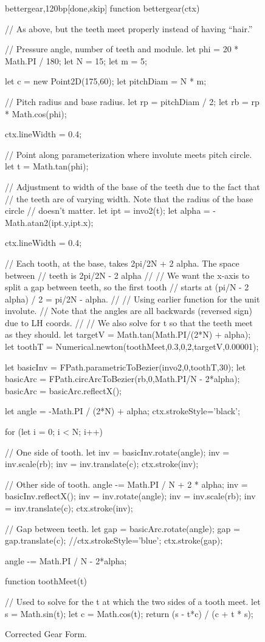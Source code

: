 \documentclass[10pt]{article}
\begin{document}
\begin{figure}
\begin{figput}{bettergear,120bp}[done,skip]
function bettergear(ctx) {

  // As above, but the teeth meet properly instead of having ``hair.''
  
  // Pressure angle, number of teeth and module.
  let phi = 20 * Math.PI / 180;
  let N = 15;
  let m = 5;

  let c = new Point2D(175,60);
  let pitchDiam = N * m;

  // Pitch radius and base radius.
  let rp = pitchDiam / 2;
  let rb = rp * Math.cos(phi);

  ctx.lineWidth = 0.4;
  
  // Point along parameterization where involute meets pitch circle.
  let t = Math.tan(phi);

  // Adjustment to width of the base of the teeth due to the fact that
  // the teeth are of varying width. Note that the radius of the base circle
  // doesn't matter.
  let ipt = invo2(t);
  let alpha = -Math.atan2(ipt.y,ipt.x);

  ctx.lineWidth = 0.4;

  // Each tooth, at the base, takes 2pi/2N + 2 alpha. The space between
  // teeth is 2pi/2N - 2 alpha
  //
  // We want the x-axis to split a gap between teeth, so the first tooth
  // starts at (pi/N - 2 alpha) / 2 = pi/2N - alpha.
  //
  // Using earlier function for the unit involute.
  // Note that the angles are all backwards (reversed sign) due to LH coords.
  //
  // We also solve for t so that the teeth meet as they should.
  let targetV = Math.tan(Math.PI/(2*N) + alpha);
  let toothT = Numerical.newton(toothMeet,0.3,0,2,targetV,0.00001);
  
  let basicInv = FPath.parametricToBezier(invo2,0,toothT,30);
  let basicArc = FPath.circArcToBezier(rb,0,Math.PI/N - 2*alpha);
  basicArc = basicArc.reflectX();

  let angle = -Math.PI / (2*N) + alpha;
  ctx.strokeStyle='black';

  for (let i = 0; i < N; i++)
    {
      // One side of tooth.
      let inv = basicInv.rotate(angle);
      inv = inv.scale(rb);
      inv = inv.translate(c);
      ctx.stroke(inv);

      // Other side of tooth.
      angle -= Math.PI / N + 2 * alpha;
      inv = basicInv.reflectX();
      inv = inv.rotate(angle);
      inv = inv.scale(rb);
      inv = inv.translate(c);
      ctx.stroke(inv);

      // Gap between teeth.
      let gap = basicArc.rotate(angle);
      gap = gap.translate(c);
      //ctx.strokeStyle='blue';
      ctx.stroke(gap);

      angle -= Math.PI / N - 2*alpha;
    }
}

function toothMeet(t) {

  // Used to solve for the t at which the two sides of a tooth meet.
  let s = Math.sin(t);
  let c = Math.cos(t);
  return (s - t*c) / (c + t * s);
}

\end{figput}
\caption{Corrected Gear Form.}
\label{fig-gear-ex-better}
\end{figure}
\end{document}
